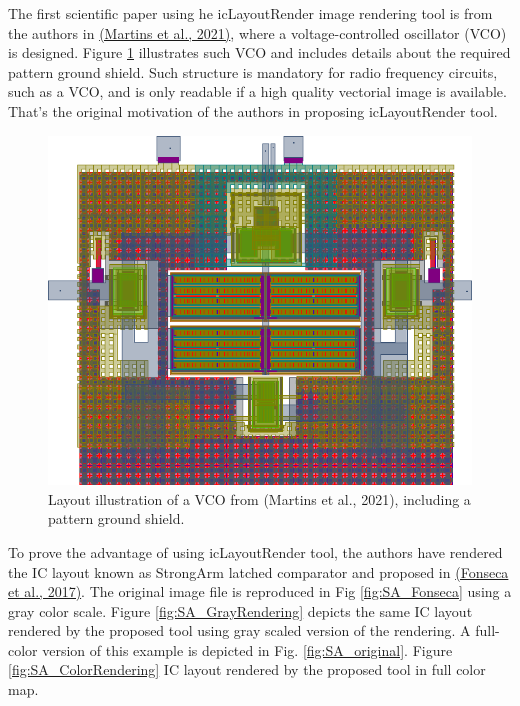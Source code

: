 \documentclass[10pt,a4paper,onecolumn]{article}
\begin{document}
The first scientific paper using he icLayoutRender image rendering tool is from the authors in
 \hyperlink{ref-Martins2021}{(Martins et al., 2021)}, where a voltage-controlled oscillator (VCO) 
is designed. Figure \ref{fig:VCO_color} illustrates such VCO and includes details about the required 
pattern ground shield. Such structure is mandatory for radio frequency circuits, such as a VCO, and 
is only readable if a high quality vectorial image is available. That's the original motivation of the 
authors in proposing icLayoutRender tool. 
\begin{figure}[ht]
\begin{center}
\includegraphics{img/VCO_color.pdf}
\caption{Layout illustration of a VCO from (Martins et al., 2021), including a pattern ground shield.}
\label{fig:VCO_color}
\end{center}\end{figure}

To prove the advantage of using icLayoutRender tool, the authors have
rendered the IC layout known as StrongArm latched comparator and proposed in \hyperlink{ref-Fonseca2017}{(Fonseca et al., 2017)}. 
The original image file is reproduced in Fig \ref{fig:SA_Fonseca} using a gray color scale. Figure \ref{fig:SA_GrayRendering} depicts the
same IC layout rendered by the proposed tool using gray scaled version
of the rendering. A full-color version of this example is depicted in
Fig. \ref{fig:SA_original}. Figure \ref{fig:SA_ColorRendering} IC layout rendered by the proposed tool in full
color map.
\end{document}
